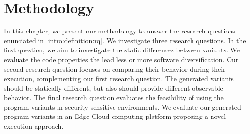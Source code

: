 \chapter{Methodology} 
\label{chapter:method}

\pagestyle{plain}
\newcommand{\libsodiumfunctions}{869}
\newcommand{\qrcodefunctions}{1849}
\newcommand{\allmewefunctions}{\libsodiumfunctions + \qrcodefunctions}

\newcommand{\py}[1]{}
\newcommand{\fromjson}[2]{}

\newcommand{\corpusrosetta}{\fromjson{data/crow_corpus.json}{.[0].name}}
\newcommand{\corpussodium}{Libsodium\xspace}
\newcommand{\corpusqrcode}{QrCode\xspace}


\newcommand{\DTWStatic}{dt\_static\xspace}
\newcommand{\DTW}{TraceDiff\xspace}
\renewcommand{\tool}{CROW\xspace}


In this chapter, we present our methodology to answer the research questions enunciated in \autoref{intro:definition:rq}.
We investigate three research questions. In the first question, we aim to investigate the static differences between variants. We evaluate the code properties the lead less or more software diversification.
Our second research question focuses on comparing their behavior during their execution, complementing our first research question. The generated variants should be statically different, but also should provide different observable behavior. 
The final research question evaluates the feasibility of using the program variants in security-sensitive environments. We evaluate our generated program variants in an Edge-Cloud computing platform proposing a novel execution approach.

